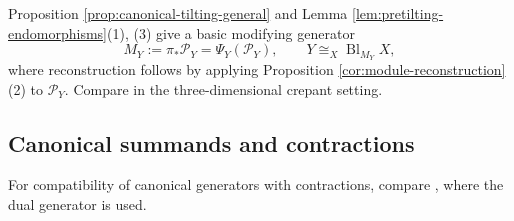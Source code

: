 \documentclass[a4paper,reqno]{amsart}
\def\P{\mathcal{P}}
\theoremstyle{definition}
\begin{document}
Proposition \ref{prop:canonical-tilting-general} and Lemma \ref{lem:pretilting-endomorphisms}(1), (3) give a basic modifying generator
\begin{equation}\label{eq:canonical-modifying-generator}
M_Y:=\pi_*\P_Y=\Psi_Y(\P_Y),
\qquad Y\cong_X\operatorname{Bl}_{M_Y}X,
\end{equation}
where reconstruction follows by applying Proposition \ref{cor:module-reconstruction}(2) to $\P_Y$. Compare \cite[Corollary 4.4]{Wem18} in the three-dimensional crepant setting.

\subsection{Canonical summands and contractions}

For compatibility of canonical generators with contractions, compare \cite[Proposition 2.14]{Wem18}, where the dual generator is used.
\end{document}
